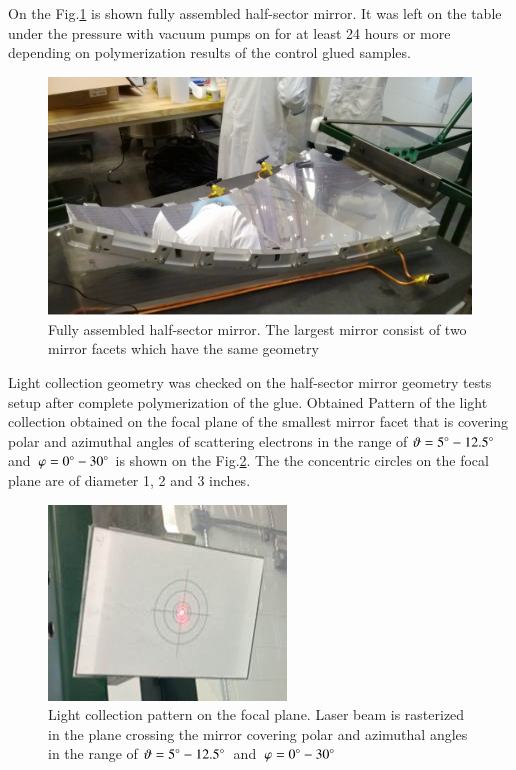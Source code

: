 On the Fig.\ref{fig:Half-sector} is shown fully assembled half-sector mirror. It was left on the table under the pressure with vacuum pumps on for at least 24 hours or more depending on polymerization results of the control glued samples. 
\begin{figure}[!h]
    \centering
    \includegraphics[width=1.0\linewidth]{Half-sector.png}
    \caption{Fully assembled half-sector mirror. The largest mirror consist of two mirror facets which have the same geometry}
    \label{fig:Half-sector}
\end{figure}{} 
\indent Light collection geometry was checked on the half-sector mirror geometry tests setup after complete polymerization of the glue. Obtained Pattern of the light collection obtained on the focal plane of the smallest mirror facet that is covering polar and azimuthal angles of scattering electrons in the range of $\vartheta = 5\degree - 12.5\degree$\, and\, $\varphi = 0\degree - 30\degree$ is shown on the Fig.\ref{fig:Focal_Plane_4}. The the concentric circles on the focal plane are of diameter 1, 2 and 3 inches.  
\begin{figure}[!h]
    \centering
    \includegraphics[width=1.0\linewidth]{Focal_Plane_4.jpg}
    \caption{Light collection pattern on the focal plane. Laser beam is rasterized in the plane crossing the mirror covering polar and azimuthal angles in the range of $\vartheta = 5\degree - 12.5\degree$\, and\, $\varphi = 0\degree - 30\degree$}
    \label{fig:Focal_Plane_4}
\end{figure}{} 

